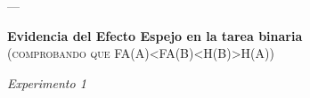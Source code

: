 \documentclass[a4paper ]{article}
\begin{document}
\clearpage





















---
\vspace{3mm}
\begin{center}
{\LARGE \textbf{Evidencia del Efecto Espejo en la tarea binaria}}\\
{\small \textsc{(comprobando que FA(A)<FA(B)<H(B)>H(A))}}\\
\smallskip
\end{center}
\begin{center}
{\LARGE \textit{Experimento 1}}\\
\end{center}
\vspace{3mm}
\end{document}
